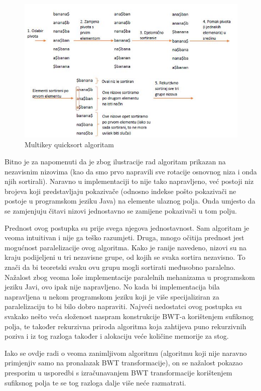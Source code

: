 \begin{figure}[h]
   \centering
       \includegraphics[width=\textwidth]{./pictures/MKQS.jpg}
 \caption{Multikey quicksort algoritam}
 \label{fig:mkqs}
\end{figure}

Bitno je za napomenuti da je zbog ilustracije rad algoritam prikazan na nezavisnim nizovima (kao da smo prvo napravili sve rotacije osnovnog niza i onda njih sortirali). Naravno u implementaciji to nije tako napravljeno, već postoji niz brojeva koji predstavljaju pokazivače (odnosno indekse pošto pokazivači ne postoje u programskom jeziku Java) na elemente ulaznog polja. Onda umjesto da se zamjenjuju čitavi nizovi jednostavno se zamijene pokazivači u tom polju.

Prednost ovog postupka su prije svega njegova jednostavnost. Sam algoritam je veoma intuitivan i nije ga teško razumjeti. Druga, mnogo očitija prednost jest mogućnost paralelizacije ovog algoritma. Kako je ranije navedeno, nizovi su na kraju podijeljeni u tri nezavisne grupe, od kojih se svaka sortira nezavisno. To znači da bi teoretski svaku ovu grupu mogli sortirati međusobno paralelno. Nažalost zbog veoma loše implementacije paralelnih mehanizama u programskom jeziku Javi, ovo ipak nije napravljeno. No kada bi implementacija bila napravljena u nekom programskom jeziku koji je više specijaliziran za paralelizaciju to bi bilo dobro napraviti. Najveći nedostatci ovog postupka su svakako nešto veća složenost naspram konstrukcije BWT-a korištenjem sufiksnog polja, te također rekurzivna priroda algoritma koja zahtijeva puno rekurzivnih poziva i iz tog razloga također i alokaciju veće količine memorije za stog.

Iako se ovdje radi o veoma zanimljivom algoritmu (algoritmu koji nije naravno primjenjiv samo na pronalazak BWT transformacije), on se nažalost pokazao presporim u usporedbi s izračunavanjem BWT transformacije korištenjem sufiksnog polja te se tog razloga dalje više neće razmatrati.

